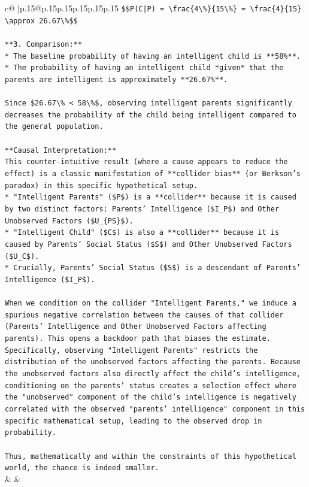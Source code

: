 \documentclass{article}
\begin{document}
{\begin{supertabular}{c@{$\;$}|p{.15\linewidth}@{}p{.15\linewidth}p{.15\linewidth}p{.15\linewidth}p{.15\linewidth}p{.15\linewidth}}
{{{\texttt{\$\$P(C|P) = \textbackslash{}frac\{4\textbackslash{}\%\}\{15\textbackslash{}\%\} = \textbackslash{}frac\{4\}\{15\} \textbackslash{}approx 26.67\textbackslash{}\%\$\$} \\
\\ 
\texttt{**3. Comparison:**} \\
\texttt{*   The baseline probability of having an intelligent child is **58\%**.} \\
\texttt{*   The probability of having an intelligent child *given* that the parents are intelligent is approximately **26.67\%**.} \\
\\ 
\texttt{Since \$26.67\textbackslash{}\% < 58\textbackslash{}\%\$, observing intelligent parents significantly decreases the probability of the child being intelligent compared to the general population.} \\
\\ 
\texttt{**Causal Interpretation:**} \\
\texttt{This counter{-}intuitive result (where a cause appears to reduce the effect) is a classic manifestation of **collider bias** (or Berkson's paradox) in this specific hypothetical setup.} \\
\texttt{*   "Intelligent Parents" (\$P\$) is a **collider** because it is caused by two distinct factors: Parents' Intelligence (\$I\_P\$) and Other Unobserved Factors (\$U\_\{PS\}\$).} \\
\texttt{*   "Intelligent Child" (\$C\$) is also a **collider** because it is caused by Parents' Social Status (\$S\$) and Other Unobserved Factors (\$U\_C\$).} \\
\texttt{*   Crucially, Parents' Social Status (\$S\$) is a descendant of Parents' Intelligence (\$I\_P\$).} \\
\\ 
\texttt{When we condition on the collider "Intelligent Parents," we induce a spurious negative correlation between the causes of that collider (Parents' Intelligence and Other Unobserved Factors affecting parents). This opens a backdoor path that biases the estimate. Specifically, observing "Intelligent Parents" restricts the distribution of the unobserved factors affecting the parents. Because the unobserved factors also directly affect the child's intelligence, conditioning on the parents' status creates a selection effect where the "unobserved" component of the child's intelligence is negatively correlated with the observed "parents' intelligence" component in this specific mathematical setup, leading to the observed drop in probability.} \\
\\ 
\texttt{Thus, mathematically and within the constraints of this hypothetical world, the chance is indeed smaller.} \\
            }
        }
    }
    & & \\ \\


\end{supertabular}}
\end{document}
